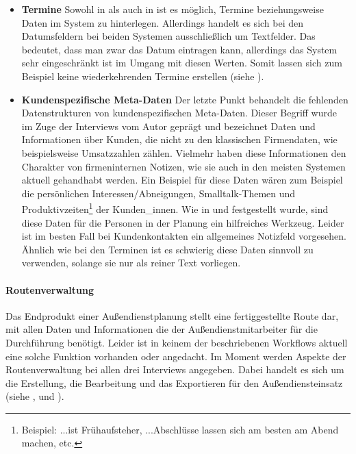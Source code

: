 \documentclass[Bachelorarbeit.tex]{subfiles}
\begin{document}
\begin{itemize}
	
\item \textbf{Termine}
Sowohl in  als auch in  ist es möglich, Termine beziehungsweise Daten im System zu hinterlegen. 
Allerdings handelt es sich bei den Datumsfeldern bei beiden Systemen ausschließlich um Textfelder. 
Das bedeutet, dass man zwar das Datum eintragen kann, allerdings das System sehr eingeschränkt ist im Umgang mit diesen Werten. 
Somit lassen sich zum Beispiel keine wiederkehrenden Termine erstellen (siehe ).


\item \textbf{Kundenspezifische Meta-Daten}
Der letzte Punkt behandelt die fehlenden Datenstrukturen von kundenspezifischen Meta-Daten.
Dieser Begriff wurde im Zuge der Interviews vom Autor geprägt und bezeichnet Daten und Informationen über Kunden, die nicht zu den klassischen Firmendaten, wie beispielsweise Umsatzzahlen zählen. 
Vielmehr haben diese Informationen den Charakter von firmeninternen Notizen, wie sie auch in den meisten Systemen aktuell gehandhabt werden.
Ein Beispiel für diese Daten wären zum Beispiel die persönlichen Interessen/Abneigungen, Smalltalk-Themen und Produktivzeiten\footnote{Beispiel: ...ist Frühaufsteher, ...Abschlüsse lassen sich am besten am Abend machen, etc.} der Kunden\_innen. 
Wie in  und  festgestellt wurde, sind diese Daten für die Personen in der Planung ein hilfreiches Werkzeug. 
Leider ist im besten Fall bei Kundenkontakten ein allgemeines Notizfeld vorgesehen. 
Ähnlich wie bei den Terminen ist es schwierig diese Daten sinnvoll zu verwenden, solange sie nur als reiner Text vorliegen.
\end{itemize}

\paragraph{Routenverwaltung}
\label{interviewsAnalyseRoutenverwaltung}
Das Endprodukt einer Außendienstplanung stellt eine fertiggestellte Route dar,  mit allen Daten und Informationen die der Außendienstmitarbeiter für die Durchführung benötigt.
Leider ist in keinem der beschriebenen Workflows aktuell eine solche Funktion vorhanden oder angedacht.
Im Moment werden Aspekte der Routenverwaltung bei allen drei Interviews angegeben.
Dabei handelt es sich um die Erstellung, die Bearbeitung und das Exportieren für den Außendiensteinsatz (siehe ,  und ). 
\end{document}
